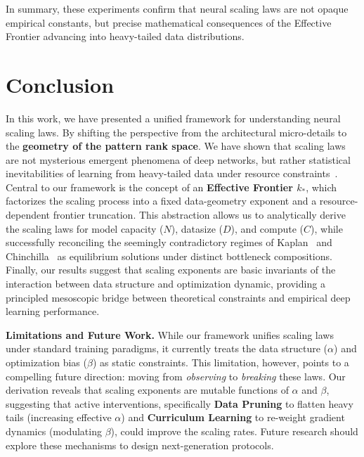 \documentclass{article}
\theoremstyle{plain}
\theoremstyle{definition}
\theoremstyle{remark}
\begin{document}
In summary, these experiments confirm that neural scaling laws are not opaque empirical constants, but precise mathematical consequences of the Effective Frontier advancing into heavy-tailed data distributions.

\section{Conclusion}
\label{sec:conclusion}

In this work, we have presented a unified framework for understanding neural scaling laws. By shifting the perspective from the architectural micro-details to the \textbf{geometry of the pattern rank space}. We have shown that scaling laws are not mysterious emergent phenomena of deep networks, but rather statistical inevitabilities of learning from heavy-tailed data under resource constraints~\citep{Newman_2005}. Central to our framework is the concept of an \textbf{Effective Frontier $k_*$}, which factorizes the scaling process into a fixed data-geometry exponent and a resource-dependent frontier truncation. This abstraction allows us to analytically derive the scaling laws for model capacity ($N$), datasize ($D$), and compute ($C$), while successfully reconciling the seemingly contradictory regimes of Kaplan~\citep{kaplan2020scalinglawsneurallanguage} and Chinchilla~\citep{hoffmann2022trainingcomputeoptimallargelanguage} as equilibrium solutions under distinct bottleneck compositions. Finally, our results suggest that scaling exponents are basic invariants of the interaction between data structure and optimization dynamic, providing a principled mesoscopic bridge between theoretical constraints and empirical deep learning performance.

\textbf{Limitations and Future Work.} 
While our framework unifies scaling laws under standard training paradigms, it currently treats the data structure ($\alpha$) and optimization bias ($\beta$) as static constraints. This limitation, however, points to a compelling future direction: moving from \textit{observing} to \textit{breaking} these laws. Our derivation reveals that scaling exponents are mutable functions of $\alpha$ and $\beta$, suggesting that active interventions, specifically \textbf{Data Pruning} to flatten heavy tails (increasing effective $\alpha$) and \textbf{Curriculum Learning} to re-weight gradient dynamics (modulating $\beta$), could improve the scaling rates. Future research should explore these mechanisms to design next-generation protocols.
\end{document}

